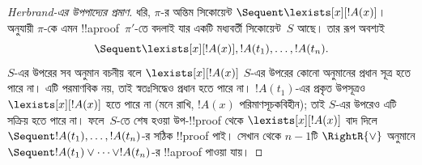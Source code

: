 \documentclass[../../../include/open-logic-section]{subfiles}
\begin{document}
\begin{proof}[Herbrand-এর উপপাদ্যের প্রমাণ]
ধরি, $\pi$-র অন্তিম সিকোয়েন্ট $\Sequent \lexists[x][!A(x)]$।
 অনুযায়ী $\pi$-কে এমন
!!a{proof}~$\pi'$-তে বদলাই যার একটি মধ্যবর্তী
সিকোয়েন্ট~$S$ আছে। তার রূপ অবশ্যই
\[\Sequent \lexists[x][!A(x)], !A(t_1), \dots, !A(t_n).\]
$S$-এর উপরের সব অনুমান বচনীয় বলে
$\lexists[x][!A(x)]$ $S$-এর উপরের কোনো অনুমানের প্রধান
সূত্র হতে পারে না। এটি পরমাণবিক নয়, তাই স্বতঃসিদ্ধেও
প্রধান হতে পারে না। $!A(t_1)$-এর প্রকৃত উপসূত্রও
$\lexists[x][!A(x)]$ হতে পারে না (মনে রাখি,
$!A(x)$ পরিমাণসূচকবিহীন); তাই $S$-এর উপরেও এটি
সক্রিয় হতে পারে না। ফলে~$S$-তে শেষ হওয়া
উপ-!!{proof} থেকে $\lexists[x][!A(x)]$ বাদ দিলে
$\Sequent !A(t_1), \dots, !A(t_n)$-র সঠিক
!!{proof} পাই। সেখান থেকে $n-1$টি
$\RightR{\lor}$ অনুমানে
$\Sequent !A(t_1) \lor \dots \lor !A(t_n)$-র
!!a{proof} পাওয়া যায়।
\end{proof}

\end{document}
